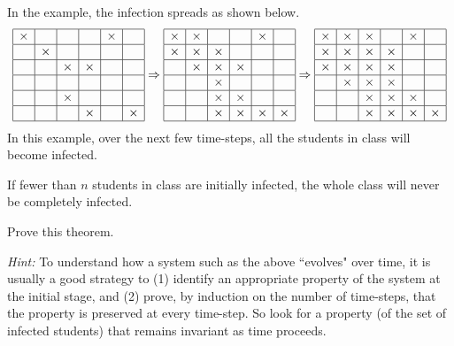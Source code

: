 \documentclass[twoside,12pt]{article}
\begin{document}
\begin{problem}{18}
In the example, the infection spreads as shown below.
%
\[
\begin{array}{|c|c|c|c|c|c|}
\hline
\times& & & &\times& \\ \hline
 &\times& & & & \\ \hline
& &\times&\times& & \\ \hline
& & & & & \\ \hline
& &\times& & & \\ \hline
& & &\times& &\times \\ \hline
\end{array}
\Rightarrow
\begin{array}{|c|c|c|c|c|c|}
\hline
\times&\times& & &\times& \\ \hline
\times&\times&\times& & & \\ \hline
&\times&\times&\times& & \\ \hline
& &\times& & & \\ \hline
& &\times&\times& & \\ \hline
& &\times&\times&\times&\times \\ \hline
\end{array}
\Rightarrow
\begin{array}{|c|c|c|c|c|c|}
\hline
\times&\times&\times& &\times& \\ \hline
\times&\times&\times&\times& & \\ \hline
\times&\times&\times&\times& & \\ \hline
&\times&\times&\times& & \\ \hline
& &\times&\times&\times& \\ \hline
& &\times&\times&\times&\times \\ \hline
\end{array}
\]
%
In this example, over the next few time-steps, all the students in class will become infected.

\begin{theorem*}
If fewer than $n$ students in class are initially infected, the whole class will never be completely infected.
\end{theorem*}

Prove this theorem.

\textit{ Hint:} To understand how a system such as the above ``evolves" over time, it is usually a good strategy to (1) identify an appropriate  property of the system at the initial stage, and (2) prove, by induction on the number of time-steps, that the property is preserved at every time-step. So look for a property (of the set of infected students) that remains invariant as time proceeds.


\end{problem}
\end{document}
